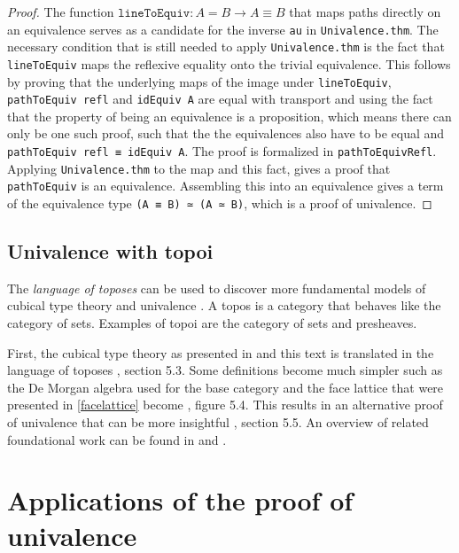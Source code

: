 \documentclass[12pt,a4paper,twoside,xetex]{book} %
\newcommand{\keyword}[1]{\emph{#1}\index{#1}}
\newcommand{\op}[1]{\mathtt{#1}}
\begin{document}
\begin{proof}
The function $\op{lineToEquiv} : A = B \rightarrow A \equiv B$ that maps paths 
directly on an equivalence serves as a candidate for the inverse \texttt{au} in 
\texttt{Univalence.thm}. The necessary condition that is still needed to apply 
\texttt{Univalence.thm} is the fact that \texttt{lineToEquiv} maps the 
reflexive equality onto the trivial equivalence. This follows by proving that 
the underlying maps of the image under \texttt{lineToEquiv}, 
\texttt{pathToEquiv refl} and \texttt{idEquiv A} are equal with transport and 
using the fact that the property of being an equivalence is a proposition, 
which means there can only be one such proof, such that the the equivalences 
also have to be equal and \texttt{pathToEquiv refl ≡ idEquiv A}. The proof is 
formalized in \texttt{pathToEquivRefl}. Applying \texttt{Univalence.thm} to the 
map and this fact, gives a proof that \texttt{pathToEquiv} is an equivalence. 
Assembling this into an equivalence gives a term of the equivalence type 
\texttt{(A ≡ B) ≃ (A ≃ B)}, which is a proof of univalence.
\end{proof}

\subsection{Univalence with topoi}

The \keyword{language of toposes} can be used to discover more fundamental 
models of cubical type theory and univalence \cite{Orton2019}. A topos is a 
category that behaves like the category of sets. Examples of topoi are the 
category of sets and presheaves. 

First, the cubical type theory as presented in \cite{Huber2016} and this text 
is translated in the  language of toposes \cite{Orton2019}, section 5.3. Some 
definitions become much simpler such as the De Morgan algebra used for the base 
category and the face lattice that were presented in \cref{facelattice} become 
\cite{Orton2019}, figure 5.4. This results in an alternative proof of 
univalence that can be more insightful \cite{Orton2019}, section 5.5. An 
overview of related foundational work can be found in \cite{Pitts2018} and 
\cite{Licata2018}.


\section{Applications of the proof of univalence} \label{applications}
\end{document}
